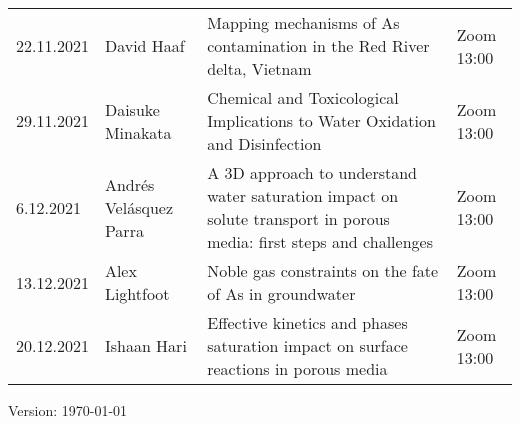 \documentclass[12pt]{article}
\begin{document}
\begin{tabular}{l p{3.2cm} p{9cm} p{2cm}}
22.11.2021
	& David Haaf
	& Mapping mechanisms of As contamination in the Red River delta, Vietnam
	& Zoom 13:00\\

29.11.2021
	& Daisuke Minakata
	& Chemical and Toxicological Implications to Water Oxidation and Disinfection
	& Zoom 13:00\\
	
6.12.2021
	& Andrés Velásquez Parra
	& A 3D approach to understand water saturation impact on solute transport in porous media: first steps and challenges
	& Zoom 13:00\\

13.12.2021
	& Alex Lightfoot
	& Noble gas constraints on the fate of As in groundwater
	& Zoom 13:00\\
	
20.12.2021
	& Ishaan Hari
	& Effective kinetics and phases saturation impact on surface reactions in porous media
	& Zoom 13:00\\
	
\end{tabular}

\vfill

{\scriptsize Version: \today}
\end{document}
